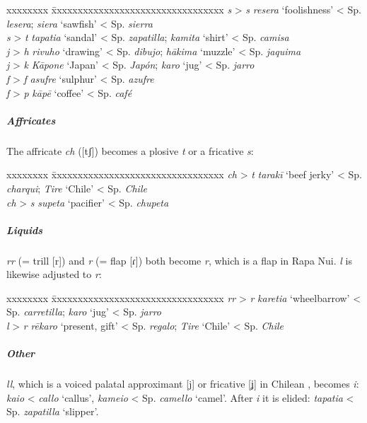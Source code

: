 \ea
\begin{tabbing}
 xxxxxxxx \= xxxxxxxxxxxxxxxxxxxxxxxxxxxxxxxxx\kill
 \textit{s} > \textit{s} \> \textit{resera} ‘foolishness’ {\textless} Sp. \textit{lesera}; \textit{siera} ‘sawfish’ {\textless} Sp. \textit{sierra} \\
\textit{s} > \textit{t} \>  \textit{tapatia} ‘sandal’ {\textless} Sp. \textit{zapatilla}; \textit{kamita} ‘shirt’ {\textless} Sp. \textit{camisa} \\
 \textit{j} > \textit{h} \>  \textit{rivuho} ‘drawing’ {\textless} Sp. \textit{dibujo}; \textit{hākima} ‘muzzle’ {\textless} Sp. \textit{jaquima} \\
\textit{j} > \textit{k} \>  \textit{Kāpone} ‘Japan’ {\textless} Sp. \textit{Japón}; \textit{karo} ‘jug’ {\textless} Sp. \textit{jarro} \\
 \textit{f} > \textit{f} \> \textit{asufre} ‘sulphur’ {\textless} Sp. \textit{azufre} \\
 \textit{f} > \textit{p} \>  \textit{kāpē} ‘coffee’ {\textless} Sp. \textit{café} 
\end{tabbing}
\z 
\subparagraph{Affricates} The affricate \textit{ch} ([tʃ]) becomes a plosive \textit{t} or a fricative \textit{s}:

\ea
\begin{tabbing}
 xxxxxxxx \= xxxxxxxxxxxxxxxxxxxxxxxxxxxxxxxxx\kill
 \textit{ch} > \textit{t} \> \textit{tarakī} ‘beef jerky’ {\textless} Sp. \textit{charqui}; \textit{Tire} ‘Chile’ {\textless} Sp. \textit{Chile} \\
 \textit{ch} > \textit{s}  \> \textit{supeta} ‘pacifier’ {\textless} Sp. \textit{chupeta} 
\end{tabbing}
\z 
\subparagraph{Liquids}  \textit{rr} (= trill [r]) and \textit{r} (= flap [ɾ]) both become \textit{r}, which is a flap in Rapa Nui. \textit{l} is likewise adjusted to \textit{r}:

\ea
\begin{tabbing}
 xxxxxxxx \= xxxxxxxxxxxxxxxxxxxxxxxxxxxxxxxxx\kill
 \textit{rr} > \textit{r} \> \textit{karetia} ‘wheelbarrow’ {\textless} Sp. \textit{carretilla}; \textit{karo} ‘jug’ {\textless} Sp. \textit{jarro} \\
 \textit{l} > \textit{r} \>  \textit{rēkaro} ‘present, gift’ {\textless} Sp. \textit{regalo}; \textit{Tire} ‘Chile’ {\textless} Sp. \textit{Chile} 
\end{tabbing}
\z 
\subparagraph{Other}  \textit{ll}, which is a voiced palatal approximant [j] or fricative [ʝ] in Chilean , becomes \textit{i}: \textit{kaio} {\textless} \textit{callo} ‘callus’, \textit{kameio} {\textless} Sp. \textit{camello} ‘camel’. After \textit{i} it is elided: \textit{tapatia} {\textless} Sp. \textit{zapatilla} ‘slipper’.

